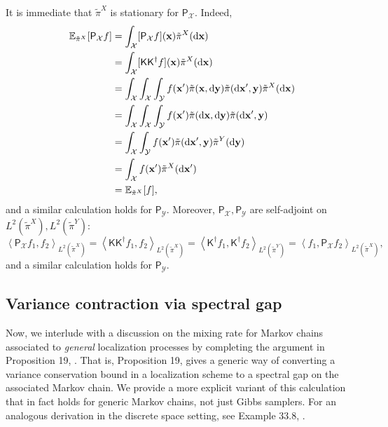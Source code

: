 \documentclass[11pt]{article}
\newcommand{\inprod}[2]{\left\langle#1, #2\right\rangle}
\newcommand{\dd}{\textup{d}}
\newcommand{\0}{\mathbf{0}}
\newcommand{\1}{\mathbf{1}}
\newcommand{\vx}{\mathbf{x}}
\newcommand{\vy}{\mathbf{y}}
\newcommand{\calX}{\mathcal{X}}
\newcommand{\calY}{\mathcal{Y}}
\newcommand{\sfK}{\mathsf{K}}
\newcommand{\sfP}{\mathsf{P}}
\newcommand{\tpi}{\tilde{\pi}}
\begin{document}
It is immediate that $\tpi^X$ is stationary for $\sfP_{\calX}$. Indeed, 
\begin{align*}
    \mathbb{E}_{\tpi^X}[\sfP_{\calX} f]
    &= \int_{\calX }[\sfP_{\calX} f](\vx)\tpi^X(\dd\vx)\\
    &= \int_{\calX }[\sfK \sfK^\dagger f](\vx)\tpi^X(\dd\vx)\\
    &=\int_{\calX }\int_{\calX}\int_{\calY} f(\vx') \tpi(\vx, \dd\vy)\tpi(\dd\vx', \vy)\tpi^X(\dd\vx)\\
    &=\int_{\calX }\int_{\calX}\int_{\calY} f(\vx') \tpi(\dd\vx, \dd\vy)\tpi(\dd\vx', \vy)\\
    &=\int_{\calX}\int_{\calY}f(\vx')\tpi(\dd\vx', \vy)\tpi^Y(\dd\vy) \\
    &=\int_{\calX} f(\vx')\tpi^X(\dd\vx')\\
    &=\mathbb{E}_{\tpi^X}[f],
\end{align*}
and a similar calculation holds for $\sfP_{\calY}$.  Moreover, $\sfP_{\calX}, \sfP_{\calY}$ are self-adjoint on $L^2(\tpi^X), L^2(\tpi^Y)$:
\begin{equation}\label{eq:reversible}
    \inprod{\sfP_{\calX}f_1}{f_2}_{L^2(\tpi^X)}=\inprod{\sfK \sfK^\dagger f_1}{f_2}_{L^2(\tpi^X)}=\inprod{\sfK^\dagger f_1}{\sfK^\dagger f_2}_{L^2(\tpi^Y)}
    =\inprod{f_1}{\sfP_{\calX}f_2}_{L^2(\tpi^X)},
\end{equation}
and a similar calculation holds for $\sfP_{\calY}$.

\subsection{Variance contraction via spectral gap}
Now, we interlude with a discussion on the mixing rate for Markov chains associated to \emph{general} localization processes by completing the argument in Proposition 19, \cite{ChenE22}. That is, Proposition 19, \cite{ChenE22} gives a generic way of converting a variance conservation bound in a localization scheme to a spectral gap on the associated Markov chain. We provide a more explicit variant of this calculation that in fact holds for generic Markov chains, not just Gibbs samplers. For an analogous derivation in the discrete space setting, see Example 33.8, \cite{PolyanskiyW25}.
\end{document}
